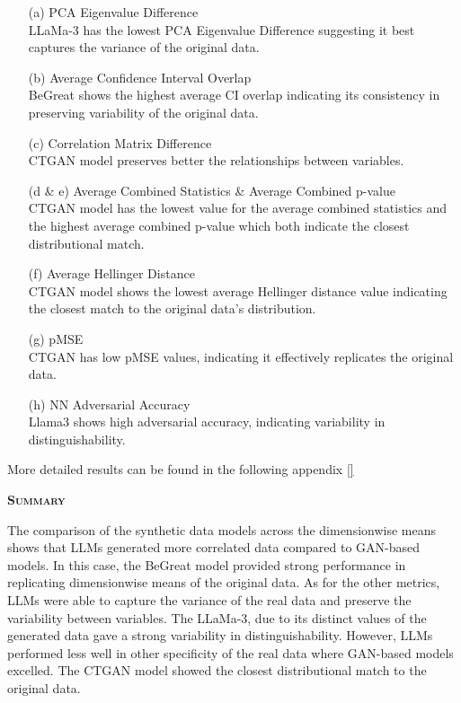 \begin{enumerate}
    \item[(a)] PCA Eigenvalue Difference \\
    LLaMa-3 has the lowest PCA Eigenvalue Difference suggesting it best captures the variance of the original data. 

    \item[(b)] Average Confidence Interval Overlap \\
    BeGreat shows the highest average CI overlap indicating its consistency in preserving variability of the original data.

    \item[(c)] Correlation Matrix Difference \\
    CTGAN model preserves better the relationships between variables.

    \item[(d \& e)] Average Combined Statistics \& Average Combined p-value \\
    CTGAN model has the lowest value for the average combined statistics and the highest average combined p-value which both indicate the closest distributional match.

    \item[(f)] Average Hellinger Distance \\
    CTGAN model shows the lowest average Hellinger distance value indicating the closest match to the original data’s distribution.

    \item[(g)] pMSE \\
    CTGAN has low pMSE values, indicating it effectively replicates the original data. 

    \item[(h)] NN Adversarial Accuracy \\
    Llama3 shows high adversarial accuracy, indicating variability in distinguishability.
\end{enumerate}

More detailed results can be found in the following appendix \ref{}

\vspace{1cm}

\noindent \textsc{ \textbf{Summary}}

The comparison of the synthetic data models across the dimensionwise means shows that LLMs generated more correlated data compared to GAN-based models. In this case, the BeGreat model provided strong performance in replicating dimensionwise means of the original data. As for the other metrics, LLMs were able to capture the variance of the real data and preserve the variability between variables. The LLaMa-3, due to its distinct values of the generated data gave a strong variability in distinguishability. However, LLMs performed less well in other specificity of the real data where GAN-based models excelled. The CTGAN model showed the closest distributional match to the original data.


